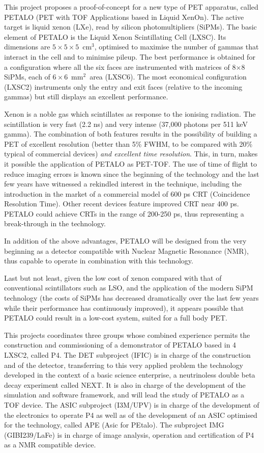 This project proposes a proof-of-concept for a new type of PET apparatus, called
PETALO (PET with TOF Applications based in Liquid XenOn). The active target is liquid xenon (LXe), read by silicon photomultipliers (SiPMs). The basic element of PETALO is the Liquid Xenon Scintillating Cell (LXSC). Its dimensions are $5\times 5 \times 5$~cm$^3$, optimised to maximise the number of gammas that interact in the cell and to minimise pileup. The best performance is obtained for a configuration where all the six faces are instrumented with matrices of  8$\times$8 SiPMs, each of $6 \times 6$~mm$^2$~area (LXSC6). The most economical configuration (LXSC2) instruments only the entry and exit faces (relative to the incoming gammas) but still displays an excellent performance. 

Xenon is a noble gas which scintillates as response to the ionising radiation. The scintillation is very fast (2.2 ns) and very intense (37,000 photons per 511 keV gamma). The combination of both features results in the possibility of building a PET of excellent resolution (better than 5\% FWHM, to be compared with 20\% typical of commercial devices) {\em and excellent time resolution}. This, in turn, makes it possible the application of PETALO as PET-TOF. The use of time of flight to reduce imaging errors is known since the beginning of the technology and the last few years have witnessed a rekindled interest in the technique, including the introduction in the market of a commercial model of 600 ps CRT (Coincidence Resolution Time). Other recent devices feature improved CRT near 400 ps. PETALO could achieve CRTs in the range of 200-250 ps, thus representing a break-through in the technology.  

In addition of the above advantages, PETALO will be designed from the very beginning as a detector compatible with Nuclear Magnetic Resonance (NMR), thus capable to operate in combination with this technology. 

Last but not least, given the low cost of xenon compared with that of conventional scintillators such as LSO, and the application of the modern SiPM technology (the costs of SiPMs has decreased dramatically over the last few years while their performance has continuously improved), it appears possible that PETALO could result in a low-cost system, suited for a full body PET.

This projects coordinates three groups whose combined experience permits the construction and commissioning of a demonstrator of PETALO based in 4 LXSC2, called P4. The DET subproject (IFIC) is in charge of the construction and of the detector, transferring to this very applied problem the technology developed in the context of a basic science enterprise, a neutrinoless double beta decay experiment called NEXT. It is also in charge of the development of the simulation and software framework, and will lead the study of PETALO as a TOF device. The ASIC subproject (I3M/UPV) is in charge of the development of the electronics to operate P4 as well as of the development of an ASIC optimised for the technology, called APE (Asic for PEtalo). The subproject IMG 
(GIBI239/LaFe) is in charge of image analysis, operation and certification of P4 as a NMR compatible device. 
 



